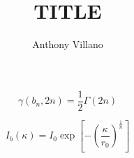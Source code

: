 \documentclass[a4paper,11pt]{article}
\author{Anthony Villano}
\title{TITLE}
\begin{document}
\maketitle



\huge
\begin{equation}
	\gamma(b_n,2n) = \frac{1}{2}\Gamma(2n) 
\end{equation}

\begin{equation}
I_b(\kappa) = I_0 \exp \left[-\left(\frac{\kappa}{r_0} \right)^{\frac{1}{n}}\right]
\end{equation}
\end{document}
